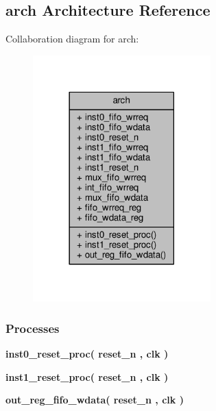\subsection{arch Architecture Reference}
\label{classrxiq__siso_1_1arch}


Collaboration diagram for arch\+:\nopagebreak
\begin{figure}[H]
\begin{center}
\leavevmode
\includegraphics[width=194pt]{d5/d27/classrxiq__siso_1_1arch__coll__graph}
\end{center}
\end{figure}
\subsubsection*{Processes}
 \begin{DoxyCompactItemize}
\item 
{\bf inst0\+\_\+reset\+\_\+proc}{\bfseries  ( {\bfseries {\bfseries {\bf reset\+\_\+n}} \textcolor{vhdlchar}{ }} , {\bfseries {\bfseries {\bf clk}} \textcolor{vhdlchar}{ }} )}
\item 
{\bf inst1\+\_\+reset\+\_\+proc}{\bfseries  ( {\bfseries {\bfseries {\bf reset\+\_\+n}} \textcolor{vhdlchar}{ }} , {\bfseries {\bfseries {\bf clk}} \textcolor{vhdlchar}{ }} )}
\item 
{\bf out\+\_\+reg\+\_\+fifo\+\_\+wdata}{\bfseries  ( {\bfseries {\bfseries {\bf reset\+\_\+n}} \textcolor{vhdlchar}{ }} , {\bfseries {\bfseries {\bf clk}} \textcolor{vhdlchar}{ }} )}
\end{DoxyCompactItemize}

